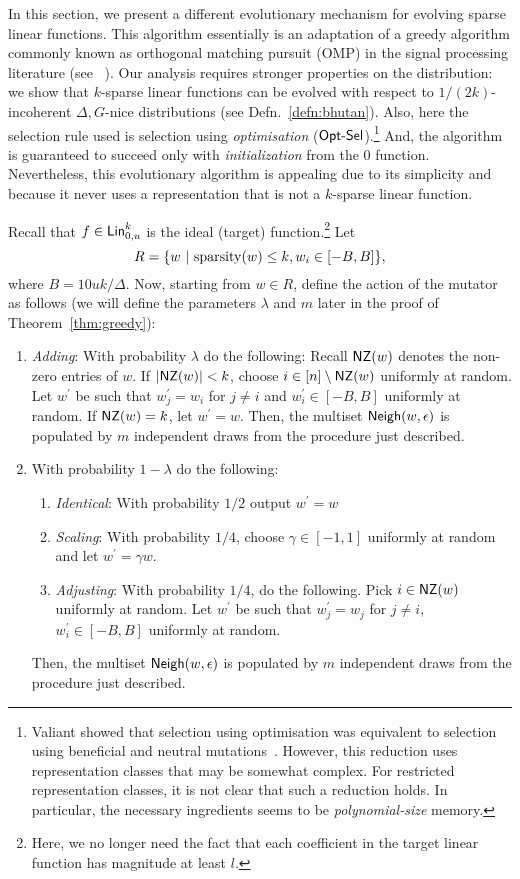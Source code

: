 In this section, we present a different evolutionary mechanism for evolving
sparse linear functions. This algorithm essentially is an adaptation of a greedy
algorithm commonly known as orthogonal matching pursuit (OMP) in the signal
processing literature (see ~\cite{Donoho:2006-recovery, Tropp:2004-greed}). Our
analysis requires stronger properties on the distribution: we show that
$k$-sparse linear functions can be evolved with respect to $1/(2k)$-incoherent
$\Delta, G$-nice distributions (see Defn.~\ref{defn:bhutan}). Also, here the
selection rule used is selection using \emph{optimisation}
($\mathsf{Opt\mbox{-}Sel}$).\footnote{Valiant showed that selection using optimisation was
equivalent to selection using beneficial and neutral
mutations~\cite{Valiant:2009-evolvability}. However, this reduction uses
representation classes that may be somewhat complex. For restricted
representation classes, it is not clear that such a reduction holds. In
particular, the necessary ingredients seems to be \emph{polynomial-size}
memory.} And, the algorithm is guaranteed to succeed only with
\emph{initialization} from the $0$ function.  Nevertheless, this evolutionary
algorithm is appealing due to its simplicity and because it never uses a
representation that is not a $k$-sparse linear function.

Recall that $f \in  \mathsf{Lin}^k_{0, u}$ is the ideal (target)
function.\footnote{Here, we no longer need the fact that each coefficient in the
target linear function has magnitude at least $l$.} Let 
%
\[ R = \{w ~|~ \mathrm{sparsity}(w) \leq k, w_i \in [-B, B] \}, \]
%
where $B = 10uk/\Delta$. Now, starting from $w \in R$, define the action of the
mutator as follows (we will define the parameters $\lambda$ and $m$ later in the
proof of Theorem~\ref{thm:greedy}):
\begin{enumerate}
\item {\em Adding}: With probability $\lambda$ do the following: Recall $\mathsf{NZ}(w)$
denotes the non-zero entries of $w$. If $|\mathsf{NZ}(w)| < k$, choose $i \in [n]
\setminus \mathsf{NZ}(w)$ uniformly at random. Let $w^\prime$ be such that $w^\prime_j =
w_i$ for $j \neq i$ and $w^\prime_i \in [-B, B]$ uniformly at random. If
$\mathsf{NZ}(w)= k$, let $w^\prime = w$. Then, the multiset $\mathsf{Neigh}(w, \epsilon)$ is
populated by $m$ independent draws from the procedure just described.
%
\item With probability $1 - \lambda$ do the following:
%
\begin{enumerate}
\item {\em Identical}: With probability $1/2$ output $w^\prime = w$
\item {\em Scaling}: With probability $1/4$, choose $\gamma \in [-1, 1]$ uniformly at
random and let $w^\prime = \gamma w$.
%
\item {\em Adjusting}: With probability $1/4$, do the following.  Pick $i \in \mathsf{NZ}(w)$
uniformly at random.  Let $w^\prime$ be such that $w^\prime_j = w_j$ for $j \neq
i$, $w^\prime_i \in [-B, B]$ uniformly at random.
\end{enumerate}
Then, the multiset $\mathsf{Neigh}(w, \epsilon)$ is populated by $m$ independent draws
from the procedure just described.
\end{enumerate}


